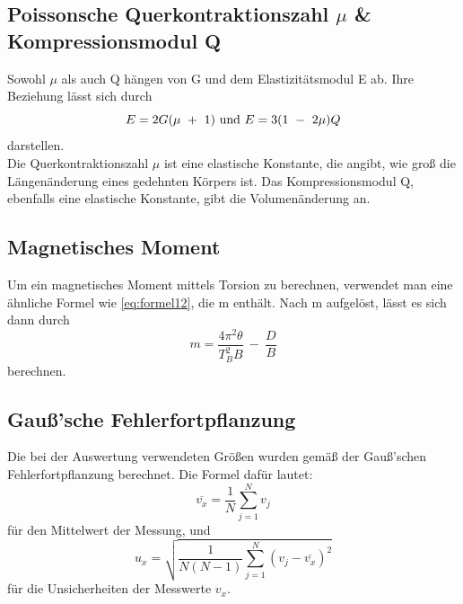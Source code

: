 \subsection{Poissonsche Querkontraktionszahl \texorpdfstring{$\mu$}{mu} \& Kompressionsmodul Q}
Sowohl $\mu$ als auch Q hängen von G und dem Elastizitätsmodul E ab.
Ihre Beziehung lässt sich durch
\begin{equation}
    E = 2G(\mu\ +\ 1)\\
    \
    \textrm{und}\\
    \
    E = 3(1\ -\ 2\mu)Q
    \label{eq:formelE}
\end{equation}
darstellen.\\
Die Querkontraktionszahl $\mu$ ist eine elastische Konstante, die angibt, wie groß die Längenänderung eines gedehnten Körpers ist.
Das Kompressionsmodul Q, ebenfalls eine elastische Konstante, gibt die Volumenänderung an.\\
\subsection{Magnetisches Moment}
Um ein magnetisches Moment mittels Torsion zu berechnen, verwendet man eine ähnliche Formel wie \autoref{eq:formel12}, die m enthält.
Nach m aufgelöst, lässt es sich dann durch
\begin{equation}
    m = \frac{4\pi^2\theta}{T_B^2B}\ -\ \frac{D}{B}
    \label{eq:formel13}
\end{equation}
berechnen.
\subsection{Gauß'sche Fehlerfortpflanzung}
Die bei der Auswertung verwendeten Größen wurden gemäß der Gauß'schen Fehlerfortpflanzung berechnet.
Die Formel dafür lautet:
\begin{equation}
    \overline{v_x}=\frac{1}{N} \sum_{j=1}^N v_j
\end{equation}
für den Mittelwert der Messung, und
\begin{equation}
    u_x = \sqrt{\frac{1}{N(N-1)} \sum_{j=1}^N (v_j-\overline{v_x})^2}
\end{equation}
für die Unsicherheiten der Messwerte $v_x$.